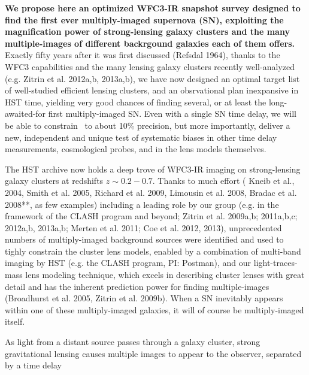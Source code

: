 {\bf  We propose here an optimized WFC3-IR snapshot survey designed to find the first ever multiply-imaged supernova (SN), exploiting the magnification power of strong-lensing galaxy clusters and the many multiple-images of different backrgound galaxies each of them offers.}
Exactly fifty years after it was first discussed (Refsdal 1964), thanks to the WFC3 capabilities and the many lensing galaxy clusters recently well-analyzed (e.g. Zitrin et al. 2012a,b, 2013a,b), we have now designed an optimal target list of well-studied efficient lensing clusters, and an obsrvational plan inexpansive in HST time, yielding very good chances of finding several, or at least the long-awaited-for first multiply-imaged SN. Even with a single SN time delay, we will be able to constrain \Ho\ to about 10\% precision, but more importantly, deliver a new, independent and unique test of systematic biases in other time delay measurements, cosmological
probes, and in the lens models themselves.

\medskip
{} The HST archive now holds a deep trove of WFC3-IR imaging on
strong-lensing galaxy clusters at redshifts $z\sim0.2-0.7$.  Thanks to much effort ( Kneib et al., 2004, Smith et al. 2005, Richard et al. 2009, Limousin et al. 2008, Bradac et al. 2008**, as few examples) including a leading role by our group (e.g. in the framework of the CLASH program and beyond; Zitrin et al. 2009a,b; 2011a,b,c; 2012a,b, 2013a,b; Merten et al. 2011; Coe et al. 2012, 2013), unprecedented numbers of multiply-imaged background sources were identified and used to tighly constrain the cluster lens models, enabled by a combination of multi-band imaging by HST (e.g. the CLASH program, PI: Postman), and our light-traces-mass lens modeling technique, which excels in describing cluster lenses with great detail and has the inherent prediction power for finding multiple-images (Broadhurst et al. 2005, Zitrin et al. 2009b).  When a SN inevitably appears within one of these multiply-imaged galaxies, it will of course be multiply-imaged itself. 

\noindent As light from a distant source passes through a galaxy cluster,
strong gravitational lensing causes multiple images to appear to the
observer, separated by a time delay 

